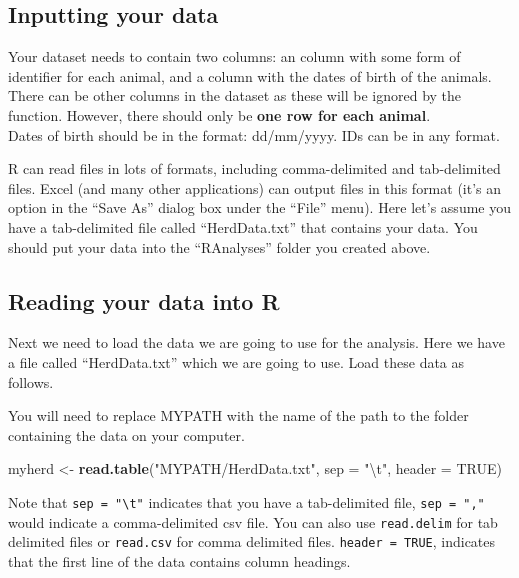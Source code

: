 \documentclass[12pt]{article}
\newcommand{\KeywordTok}[1]{\textcolor[rgb]{0.13,0.29,0.53}{\textbf{{#1}}}}
\newcommand{\DataTypeTok}[1]{\textcolor[rgb]{0.13,0.29,0.53}{{#1}}}
\newcommand{\CharTok}[1]{\textcolor[rgb]{0.31,0.60,0.02}{{#1}}}
\newcommand{\StringTok}[1]{\textcolor[rgb]{0.31,0.60,0.02}{{#1}}}
\newcommand{\OtherTok}[1]{\textcolor[rgb]{0.56,0.35,0.01}{{#1}}}
\newcommand{\NormalTok}[1]{{#1}}
\begin{document}
\subsection{Inputting your data}
Your dataset needs to contain two columns: an column with some form of identifier for each animal, and a column with the dates of birth of the animals. There can be other columns in the dataset as these will be ignored by the function. However, there should only be \textbf{one row for each animal}.\\

Dates of birth should be in the format: dd/mm/yyyy. IDs can be in any format.

R can read files in lots of formats, including comma-delimited and
tab-delimited files. Excel (and many other applications) can output
files in this format (it's an option in the ``Save As'' dialog box
under the ``File'' menu). Here let's assume you have a tab-delimited 
file called ``HerdData.txt'' that contains your data. You should put 
your data into the ``RAnalyses'' folder you created above.

\subsection{Reading your data into R}
Next we need to load the data we are going to use for the analysis. 
Here we have a file called ``HerdData.txt''
which we are going to use. Load these data as follows. 

\begin{framed}
You will need to replace MYPATH with the name of the path to the folder 
containing the data on your computer.
\end{framed}

\begin{snugshade}
\begin{Highlighting}[]
\NormalTok{myherd <-}\StringTok{ }\KeywordTok{read.table}\NormalTok{(}\StringTok{"MYPATH/HerdData.txt"}\NormalTok{, }\DataTypeTok{sep =} \StringTok{"}\CharTok{\textbackslash{}t}\StringTok{"}\NormalTok{, }\DataTypeTok{header =} \OtherTok{TRUE}\NormalTok{)}
\end{Highlighting}
\end{snugshade}

Note that \texttt{sep = "\textbackslash{}t"} indicates that you have a tab-delimited file, 
\texttt{sep = ","}  would indicate a comma-delimited csv file. You can also use
\texttt{read.delim} for tab delimited files or \texttt{read.csv} for comma delimited
files. \texttt{header = TRUE}, indicates that the first line of the data contains
column headings.
\end{document}
